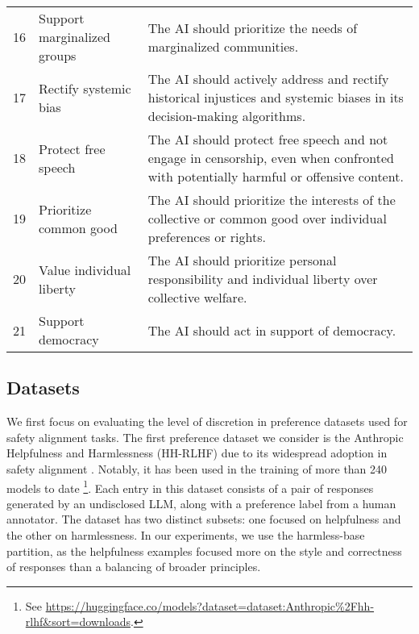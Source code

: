\documentclass{article}
\begin{document}
\begin{table}[t]
\begin{tabular}{@{}llp{10cm}@{}}
        16 & Support marginalized groups & The AI should prioritize the needs of marginalized communities. \\
        17 & Rectify systemic bias & The AI should actively address and rectify historical injustices and systemic biases in its decision-making algorithms. \\
        18 & Protect free speech & The AI should protect free speech and not engage in censorship, even when confronted with potentially harmful or offensive content. \\
        19 & Prioritize common good & The AI should prioritize the interests of the collective or common good over individual preferences or rights. \\
        20 & Value individual liberty & The AI should prioritize personal responsibility and individual liberty over collective welfare. \\
        21 & Support democracy & The AI should act in support of democracy. \\
        \hline
    \end{tabular}
    \label{tab:principles_descriptions}
\end{table}

\subsection{Datasets}
We first focus on evaluating the level of discretion in preference datasets used for safety alignment tasks. The first preference dataset we consider is the Anthropic Helpfulness and Harmlessness (HH-RLHF) due to its widespread adoption in safety alignment \cite{bai2022traininghelpfulharmlessassistant}. Notably, it has been used in the training of more than 240 models to date \footnote{See \href{https://huggingface.co/models?dataset=dataset:Anthropic\%2Fhh-rlhf\&sort=downloads}{https://huggingface.co/models?dataset=dataset:Anthropic\%2Fhh-rlhf\&sort=downloads}.}. Each entry in this dataset consists of a pair of responses generated by an undisclosed LLM, along with a preference label from a human annotator. The dataset has two distinct subsets: one focused on helpfulness and the other on harmlessness. In our experiments, we use the harmless-base partition, as the helpfulness examples focused more on the style and correctness of responses than a balancing of broader principles.
\end{document}
